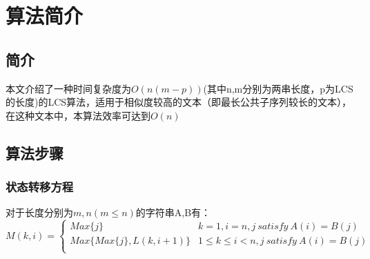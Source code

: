 
\chapter{算法简介}

\section{简介}
本文介绍了一种时间复杂度为$O(n(m-p))$(其中n,m分别为两串长度，p为LCS的长度)的LCS算法，适用于相似度较高的文本（即最长公共子序列较长的文本），在这种文本中，本算法效率可达到$O(n)$


\section{算法步骤}

\subsection{状态转移方程}
对于长度分别为$m,n(m\leq n)$的字符串A,B有：
$$
M(k,i)=
\left\{\begin{matrix}
Max\{j\} & k=1,i=n,j\ satisfy\ A(i)=B(j)
\\ 
Max\{Max\{j\},L(k,i+1)\} & 1\leq k\leq i<n, j\ satisfy\ A(i)=B(j)
\\ 
\end{matrix}\right.
$$


